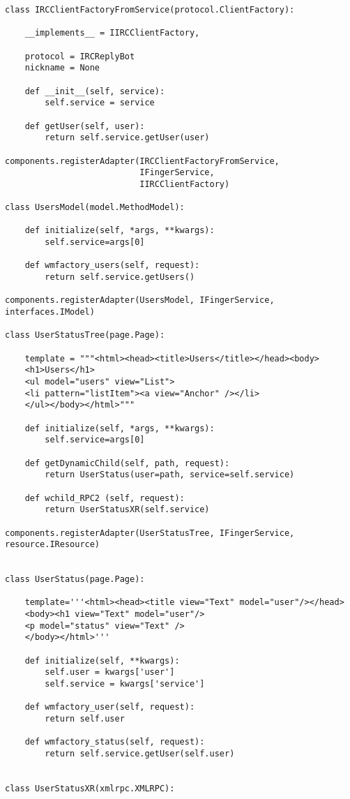 \begin{verbatim}
class IRCClientFactoryFromService(protocol.ClientFactory):

    __implements__ = IIRCClientFactory,

    protocol = IRCReplyBot
    nickname = None

    def __init__(self, service):
        self.service = service

    def getUser(self, user):
        return self.service.getUser(user)

components.registerAdapter(IRCClientFactoryFromService,
                           IFingerService,
                           IIRCClientFactory)

class UsersModel(model.MethodModel):

    def initialize(self, *args, **kwargs):
        self.service=args[0]

    def wmfactory_users(self, request):
        return self.service.getUsers()

components.registerAdapter(UsersModel, IFingerService, interfaces.IModel)

class UserStatusTree(page.Page):

    template = """<html><head><title>Users</title></head><body>
    <h1>Users</h1>
    <ul model="users" view="List">
    <li pattern="listItem"><a view="Anchor" /></li>
    </ul></body></html>"""

    def initialize(self, *args, **kwargs):
        self.service=args[0]

    def getDynamicChild(self, path, request):
        return UserStatus(user=path, service=self.service)

    def wchild_RPC2 (self, request):
        return UserStatusXR(self.service)

components.registerAdapter(UserStatusTree, IFingerService, resource.IResource)


class UserStatus(page.Page):

    template='''<html><head><title view="Text" model="user"/></head>
    <body><h1 view="Text" model="user"/>
    <p model="status" view="Text" />
    </body></html>'''

    def initialize(self, **kwargs):
        self.user = kwargs['user']
        self.service = kwargs['service']

    def wmfactory_user(self, request):
        return self.user

    def wmfactory_status(self, request):
        return self.service.getUser(self.user)


class UserStatusXR(xmlrpc.XMLRPC):


\end{verbatim}
